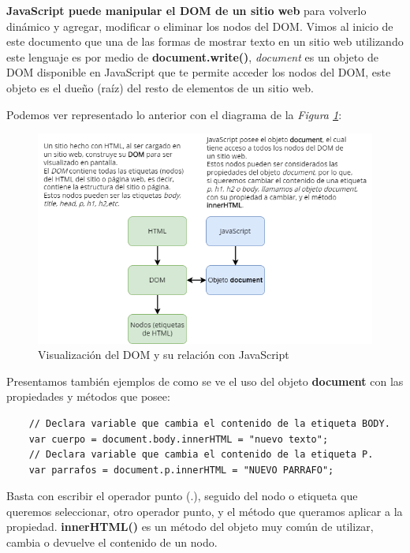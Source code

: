 \textbf{JavaScript puede manipular el DOM de un sitio web} para volverlo dinámico y agregar, modificar o eliminar los nodos del DOM. Vimos al inicio de este documento que una de las formas de mostrar texto en un sitio web utilizando este lenguaje es por medio de \textbf{document.write()}, \textit{document} es un objeto de DOM disponible en JavaScript que te permite acceder los nodos del DOM, este objeto es el dueño (raíz) del resto de elementos de un sitio web.

Podemos ver representado lo anterior con el diagrama de la \textit{Figura \ref{fig: 6}}:
\begin{figure}[H]
    \caption{Visualización del DOM y su relación con JavaScript}
    \label{fig: 6}
    \begin{center}
        \includegraphics [width=13cm]{ss/dom_explicacion.png}
    \end{center}
\end{figure}

Presentamos también ejemplos de como se ve el uso del objeto \textbf{document} con las propiedades y métodos que posee:
\begin{lstlisting}
    // Declara variable que cambia el contenido de la etiqueta BODY.
    var cuerpo = document.body.innerHTML = "nuevo texto";
    // Declara variable que cambia el contenido de la etiqueta P.
    var parrafos = document.p.innerHTML = "NUEVO PARRAFO";
\end{lstlisting}

Basta con escribir el operador punto (.), seguido del nodo o etiqueta que queremos seleccionar, otro operador punto, y el método que queramos aplicar a la propiedad. \textbf{innerHTML()} es un método del objeto muy común de utilizar, cambia o devuelve el contenido de un nodo.


